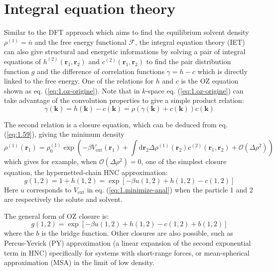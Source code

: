 \section{Integral equation theory}

Similar to the \acs{DFT} approach which aims to find the equilibrium
solvent density $\rho^{(1)}=\bar{n}$ and the free energy functional
$\mathcal{F}$, the integral equation theory (\acs{IET}) can also
give structural and energetic informations by solving a pair of integral
equations of $h^{(2)}(\mathbf{r}_{1},\mathbf{r}_{2})$ and $c^{(2)}(\mathbf{r}_{1},\mathbf{r}_{2})$
to find the pair distribution function $g$ and the difference of
correlation functions $\gamma=h-c$ which is directly linked to the
free energy. One of the relations for $h$ and $c$ is the \acs{OZ}
equation shown as eq. (\ref{eq:1.oz-origine}). Note that in $k$-space
eq. (\ref{eq:1.oz-origine}) can take advantage of the convolution
properties to give a simple product relation:
\begin{equation}
\gamma(\mathbf{k})=h(\mathbf{k})-c(\mathbf{k})=\rho\left(\gamma(\mathbf{k})+c(\mathbf{k})\right)c(\mathbf{k})\label{eq:3.oz-k}
\end{equation}

The second relation is a closure equation, which can be deduced from
eq. (\ref{eq:1.59}), giving the minimum density
\begin{equation}
\rho^{(1)}(\mathbf{r}_{1})=\rho_{0}^{(1)}\exp\left(-\beta V_{\mathrm{ext}}(\mathbf{r}_{1})+\int\mathrm{d}\mathbf{\mathbf{r}}_{2}\Delta\rho^{(1)}(\mathbf{r}_{2})c^{(2)}(\mathbf{r}_{1},\mathbf{r}_{2})+\mathcal{O}(\Delta\rho{}^{2})\right)\label{eq:1.minimize-anal}
\end{equation}
which gives for example, when $\mathcal{O}(\Delta\rho{}^{2})=0$,
one of the simplest closure equation, the hypernetted-chain \acs{HNC}
approximation:
\begin{equation}
g(1,2)=1+h(1,2)=\exp\left[-\beta u(1,2)+h(1,2)-c(1,2)\right]
\end{equation}
Here $u$ corresponds to $V_{\mathrm{ext}}$ in eq. (\ref{eq:1.minimize-anal})
when the particle 1 and 2 are respectively the solute and solvent.

The general form of \acs{OZ} closure is:
\begin{equation}
g(1,2)=\exp\left[-\beta u(1,2)+h(1,2)-c(1,2)+b(1,2)\right]
\end{equation}
where the $b$ is the bridge function. Other closures are also possible,
such as Percus-Yevick (PY) approximation (a linear expansion of the
second exponential term in \acs{HNC}) specifically for systems with
short-range forces, or mean-spherical approximation (MSA) in the limit
of low density.

